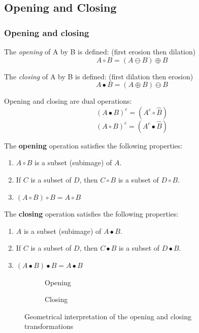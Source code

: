 \subsection{Opening and Closing}
\subsubsection{Opening and closing}
The \emph{opening} of A by B is defined: (first erosion then dilation)
\[
	A \circ B = (A \ominus B) \oplus B
\]

The \emph{closing} of A by B is defined: (first dilation then erosion)
\[
	A  \bullet B = (A \oplus B) \ominus B
\]

Opening and closing are dual operations:
\[
	(A  \bullet B)^c = (A^c \circ \hat{B})
\]
\[
	(A \circ B)^c = (A^c \bullet \hat{B})
\]

The \textbf{opening} operation satisfies the following properties:
\begin{enumerate}[label=\textbf{(\alph*)}]
	\item $A \circ B$ is a subset (subimage) of $A$.
	\item If $C$ is a subset of $D$, then $C \circ B$ is a subset of $D \circ B$.
	\item $(A \circ B) \circ B = A \circ B$
\end{enumerate}

The \textbf{closing} operation satisfies the following properties:
\begin{enumerate}[label=\textbf{(\alph*)}]
	\item $A$ is a subset (subimage) of $A \bullet B$.
	\item If $C$ is a subset of $D$, then $C \bullet B$ is a subset of $D \bullet B$.
	\item $(A \bullet B) \bullet B = A \bullet B$
\end{enumerate}

\begin{figure}[h!]
	\centering
	\begin{subfigure}[b]{0.45\textwidth}
		\centering
		\caption{Opening}
	\end{subfigure}
	\begin{subfigure}[b]{0.45\textwidth}
		\centering
		\caption{Closing}
	\end{subfigure}
	\caption{Geometrical interpretation of the opening and closing transformations}
\end{figure}


